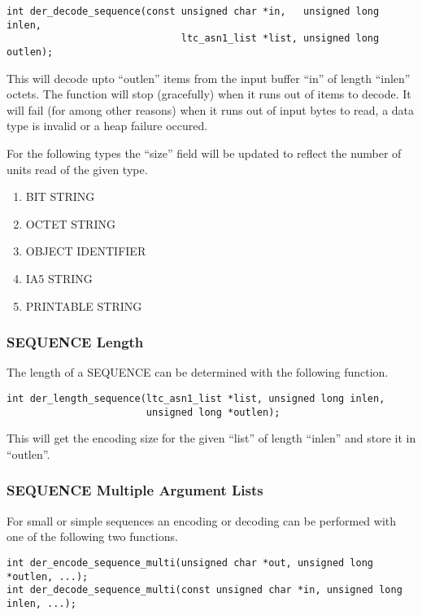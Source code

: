 \documentclass[a4paper]{book}
\begin{document}
\begin{verbatim}
int der_decode_sequence(const unsigned char *in,   unsigned long  inlen,
                              ltc_asn1_list *list, unsigned long  outlen);
\end{verbatim}

This will decode upto ``outlen'' items from the input buffer ``in'' of length ``inlen'' octets.  The function will stop (gracefully) when it runs out of items to decode.
It will fail (for among other reasons) when it runs out of input bytes to read, a data type is invalid or a heap failure occured.

For the following types the ``size'' field will be updated to reflect the number of units read of the given type.
\begin{enumerate}
   \item BIT STRING
   \item OCTET STRING
   \item OBJECT IDENTIFIER
   \item IA5 STRING
   \item PRINTABLE STRING
\end{enumerate}

\subsubsection{SEQUENCE Length}

The length of a SEQUENCE can be determined with the following function.

\begin{verbatim}
int der_length_sequence(ltc_asn1_list *list, unsigned long inlen,
                        unsigned long *outlen);
\end{verbatim}

This will get the encoding size for the given ``list'' of length ``inlen'' and store it in ``outlen''.  

\subsubsection{SEQUENCE Multiple Argument Lists}

For small or simple sequences an encoding or decoding can be performed with one of the following two functions.


\begin{verbatim}
int der_encode_sequence_multi(unsigned char *out, unsigned long *outlen, ...);
int der_decode_sequence_multi(const unsigned char *in, unsigned long inlen, ...);
\end{verbatim}
\end{document}
